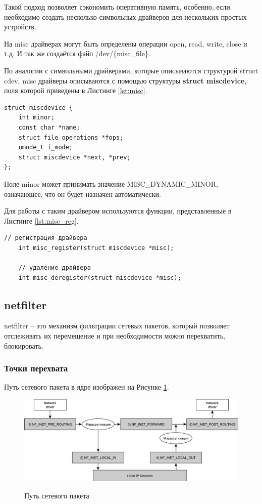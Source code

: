 Такой подход позволяет сэкономить оперативную память, особенно, если необходимо создать несколько символьных драйверов для нескольких простых устройств.

На misc драйверах могут быть определены операции open, read, write, close и т.д. И так же создаётся файл /dev/\{misc\_file\}.

По аналогии с символьными драйверами, которые описываются структурой struct cdev, misc драйверы описываются с помощью структуры \textbf{struct miscdevice}, поля которой приведены в Листинге \ref{lst:misc}.
\begin{lstlisting}[caption = {struct miscdevice}, label=lst:misc]
struct miscdevice {
	int minor;
	const char *name;
	struct file_operations *fops;
	umode_t i_mode;
	struct miscdevice *next, *prev;
};
\end{lstlisting}

Поле minor может принимать значение MISC\_DYNAMIC\_MINOR, означающее, что он будет назначен автоматически. 

Для работы с таким драйвером используются функции, представленные в Листинге \ref{lst:misc_reg}.
\newline
\begin{lstlisting}[caption = {Функции для регистрации и удаления misc драйвера}, label=lst:misc_reg]
	// регистрация драйвера
	int misc_register(struct miscdevice *misc);
	
	// удаление драйвера
	int misc_deregister(struct miscdevice *misc);
\end{lstlisting}

\subsection{netfilter}
netfilter -- это механизм фильтрации сетевых пакетов, который позволяет отслеживать их перемещение и при необходимости можно перехватить, блокировать. \cite{hook} \newline

\subsubsection{Точки перехвата}
Путь сетевого пакета в ядре изображен на Рисунке \ref{fig2:image}. \\

\begin{figure}[ph!]
	\centering
	\begin{center}
		{\includegraphics[scale=0.6]{img/packets.pdf}}
		\caption{Путь сетевого пакета}
		\label{fig2:image}
	\end{center}
\end{figure}

